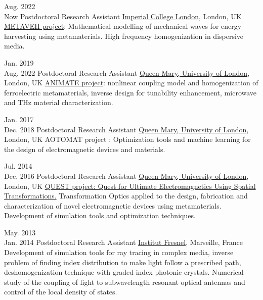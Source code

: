 \documentclass{cv}
\begin{document}
\begin{entrylist}

	\entry
	{Aug. 2022 \\Now}
	{Postdoctoral Research Assistant}
	{\href{http://imperial.ac.uk/}{Imperial College London}, London, UK}
	{\href{https://www.metaveh.com/}{METAVEH project}: Mathematical modelling of mechanical waves for energy harvesting using metamaterials. High frequency homogenization in dispersive media.
	}


	\entry
	{Jan. 2019 \\Aug. 2022}
	{Postdoctoral Research Assistant}
	{\href{http://antennas.eecs.qmul.ac.uk/}{Queen Mary, University of London}, London, UK}
	{\href{https://animate-research.com/}{ANIMATE project}: nonlinear coupling model and homogenization of ferroelectric
		metamaterials, inverse design for tunability enhancement, microwave and THz material characterization.
	}


	\entry
	{Jan. 2017 \\Dec. 2018}
	{Postdoctoral Research Assistant}
	{\href{http://antennas.eecs.qmul.ac.uk/}{Queen Mary, University of London}, London, UK}
	{AOTOMAT project : Optimization tools and machine learning for the design of electromagnetic
		devices and materials.
	}

	\entry
	{Jul. 2014 \\Dec. 2016}
	{Postdoctoral Research Assistant}
	{\href{http://antennas.eecs.qmul.ac.uk/}{Queen Mary, University of London}, London, UK}
	{\href{http://www.quest-spatial-transformation.org/}{QUEST project: Quest for Ultimate Electromagnetics Using Spatial Transformations.}
		Transformation Optics applied to the design, fabrication and characterization of novel electromagnetic devices using metamaterials.
		Development of simulation tools and optimization techniques.
	}


	\entry
	{May. 2013\\ Jan. 2014}
	{Postdoctoral Research Assistant}
	{\href{http://www.fresnel.fr/}{Institut Fresnel}, Marseille, France}
	{		Development of simulation tools for ray tracing in complex media, inverse problem of
	finding index distribution to make light follow a prescribed path, deshomogenization
	technique with graded index photonic crystals.
		Numerical study of the coupling of light
		to subwavelength resonant optical antennas and control of the local density of states.
	}


\end{entrylist}
\end{document}
